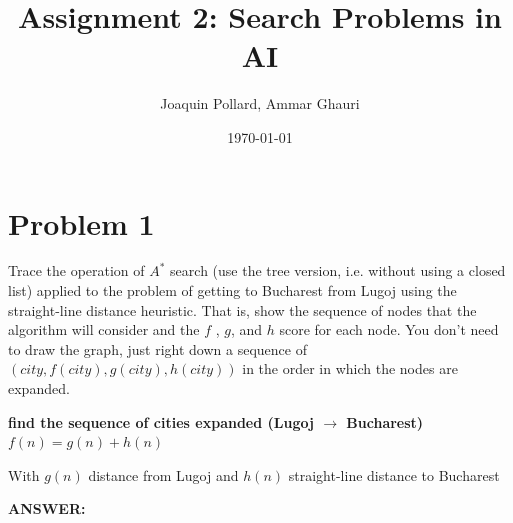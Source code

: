\documentclass{article}
\title{Assignment 2: Search Problems in AI}
\author{Joaquin Pollard, Ammar Ghauri}
\date{\today}
\begin{document}
\maketitle

\section*{Problem 1}
Trace the operation of $A^*$ search (use the tree version, i.e. without using a closed list) applied to
the problem of getting to Bucharest from Lugoj using the straight-line distance heuristic. That is, show the sequence of
nodes that the algorithm will consider and the $f$ , $g$, and $h$ score for each node. You don’t need to draw the graph, just right
down a sequence of $(city, f (city), g(city), h(city))$ in the order in which the nodes are expanded.

\begin{center}
   \textbf{find the sequence of cities expanded (Lugoj $\rightarrow$  Bucharest)}\\
   $f(n) = g(n) + h(n)$
\end{center}
With $g(n)$ distance from Lugoj and $h(n)$ straight-line distance to Bucharest

\textbf{ANSWER:}
\end{document}
